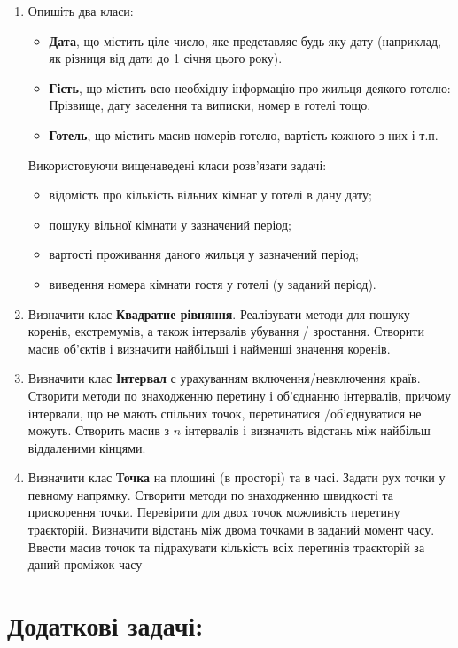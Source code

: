 \documentclass[a5paper,titlepage,openany,twoside,
]
{book_unv}%
\begin{document}
\begin{enumerate}
\item
Опишіть два класи:
\begin{itemize}
\item
\textbf{Дата}, що містить ціле число, яке представляє будь-яку дату
(наприклад, як різниця від дати до 1 січня цього року).
\item
\textbf{Гість}, що містить всю необхідну інформацію про жильця
деякого готелю: Прізвище, дату заселення та виписки, номер в готелі тощо.
\item
\textbf{Готель}, що містить масив номерів готелю, вартість кожного з них і т.п.
\end{itemize}
Використовуючи вищенаведені класи розв'язати задачі:
\begin{itemize}
\item відомість про кількість вільних кімнат у готелі в дану дату;
\item пошуку вільної кімнати у зазначений період;
\item вартості проживання даного жильця у зазначений період;
\item виведення номера кімнати гостя у готелі (у заданий період).
\end{itemize}

\item
Визначити клас \textbf{Квадратне рівняння}. Реалізувати методи для пошуку коренів,
екстремумів, а також інтервалів убування / зростання. Створити масив об'єктів і 
визначити найбільші і найменші значення коренів.
\item
Визначити клас \textbf{Інтервал} с урахуванням включення/невключення країв. 
Створити методи по знаходженню перетину і об'єднанню інтервалів, 
причому інтервали, що не мають спільних точок, перетинатися /об'єднуватися не можуть. 
Створить масив з $n$ інтервалів і визначить відстань між найбільш віддаленими кінцями.

\item
Визначити клас \textbf{Точка} на площині (в просторі) та в часі. 
Задати рух точки у певному напрямку. Створити методи по знаходженню швидкості та прискорення точки. 
Перевірити для двох точок можливість перетину траєкторій. 
Визначити відстань між двома точками в заданий момент часу.
Ввести масив точок та підрахувати кількість всіх перетинів траєкторій за даний проміжок часу

\end{enumerate}

\section{Додаткові задачі:}
\end{document}
